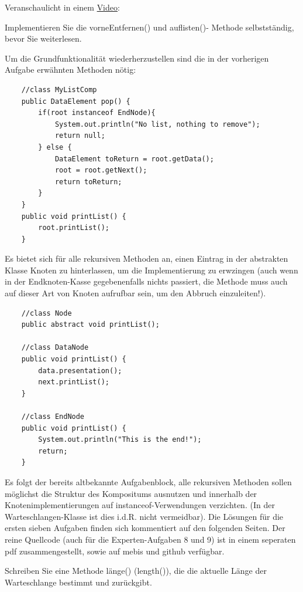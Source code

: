 \documentclass{article}
\begin{document}
Veranschaulicht in einem \href{https://youtu.be/1YPStkwFbKI}{Video}:
\begin{task}{2}
    Implementieren Sie die vorneEntfernen() und auflisten()- Methode selbstständig, bevor Sie weiterlesen. 
\end{task}
\vspace{3cm}
Um die Grundfunktionalität wiederherzustellen sind die in der vorherigen Aufgabe erwähnten Methoden nötig:
\begin{verbatim}
    //class MyListComp
    public DataElement pop() {
        if(root instanceof EndNode){
            System.out.println("No list, nothing to remove");
            return null;
        } else {
            DataElement toReturn = root.getData();
            root = root.getNext();
            return toReturn;
        }
    }
    public void printList() {
        root.printList();
    }
\end{verbatim}
Es bietet sich für alle rekursiven Methoden an, einen Eintrag in der abstrakten Klasse Knoten zu hinterlassen, um die Implementierung zu erwzingen (auch wenn in der Endknoten-Kasse gegebenenfalls nichts passiert, die Methode muss auch auf dieser Art von Knoten aufrufbar sein, um den Abbruch einzuleiten!).
\begin{verbatim}
    //class Node
    public abstract void printList();

    //class DataNode
    public void printList() {
        data.presentation();
        next.printList(); 
    }

    //class EndNode 
    public void printList() {
        System.out.println("This is the end!");
        return;    
    }
\end{verbatim}

Es folgt der bereits altbekannte Aufgabenblock, alle rekursiven Methoden sollen möglichst die Struktur des Kompositums ausnutzen und innerhalb der Knotenimplementierungen auf instanceof-Verwendungen verzichten. (In der Warteschlangen-Klasse ist dies i.d.R. nicht vermeidbar). Die Lösungen für die ersten sieben Aufgaben finden sich kommentiert auf den folgenden Seiten. Der reine Quellcode (auch für die Experten-Aufgaben 8 und 9) ist in einem seperaten pdf zusammengestellt, sowie auf mebis und github verfügbar. \\ 

\begin{task}{3} 
    Schreiben  Sie eine Methode länge() (length()), die die aktuelle Länge der Warteschlange bestimmt und zurückgibt.   
\end{task}
\end{document}
